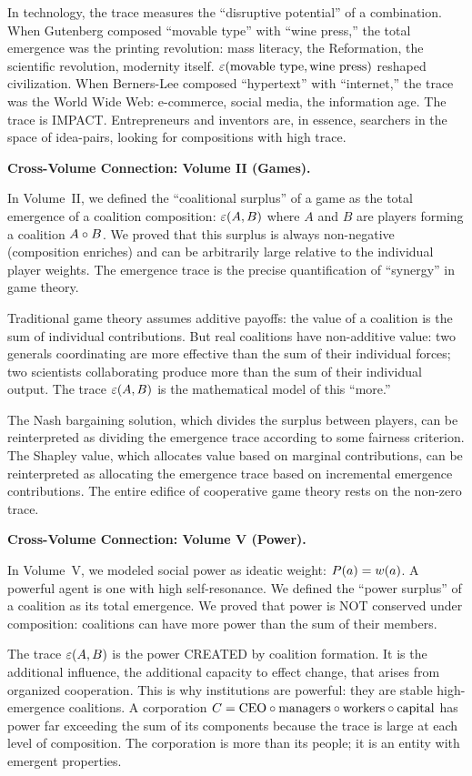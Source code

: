 \begin{interpretation}
In technology, the trace measures the ``disruptive potential'' of a combination.
When Gutenberg composed ``movable type'' with ``wine press,'' the total emergence
was the printing revolution: mass literacy, the Reformation, the scientific
revolution, modernity itself. $\varepsilon(\text{movable type}, \text{wine press})$
reshaped civilization. When Berners-Lee composed ``hypertext'' with ``internet,''
the trace was the World Wide Web: e-commerce, social media, the information age.
The trace is IMPACT. Entrepreneurs and inventors are, in essence, searchers in
the space of idea-pairs, looking for compositions with high trace.

\textbf{Cross-Volume Connection: Volume II (Games).}

In Volume~II, we defined the ``coalitional surplus'' of a game as the total
emergence of a coalition composition: $\varepsilon(A, B)$ where $A$ and $B$ are
players forming a coalition $A \circ B$. We proved that this surplus is
always non-negative (composition enriches) and can be arbitrarily large relative
to the individual player weights. The emergence trace is the precise quantification
of ``synergy'' in game theory.

Traditional game theory assumes additive payoffs: the value of a coalition is
the sum of individual contributions. But real coalitions have non-additive value:
two generals coordinating are more effective than the sum of their individual
forces; two scientists collaborating produce more than the sum of their individual
output. The trace $\varepsilon(A, B)$ is the mathematical model of this ``more.''

The Nash bargaining solution, which divides the surplus between players, can be
reinterpreted as dividing the emergence trace according to some fairness criterion.
The Shapley value, which allocates value based on marginal contributions, can be
reinterpreted as allocating the emergence trace based on incremental emergence
contributions. The entire edifice of cooperative game theory rests on the non-zero
trace.

\textbf{Cross-Volume Connection: Volume V (Power).}

In Volume~V, we modeled social power as ideatic weight: $P(a) = w(a)$.
A powerful agent is one with high self-resonance. We defined the ``power surplus''
of a coalition as its total emergence. We proved that power is NOT conserved
under composition: coalitions can have more power than the sum of their members.

The trace $\varepsilon(A, B)$ is the power CREATED by coalition formation. It is
the additional influence, the additional capacity to effect change, that arises
from organized cooperation. This is why institutions are powerful: they are
stable high-emergence coalitions. A corporation $C = \text{CEO} \circ \text{managers}
\circ \text{workers} \circ \text{capital}$ has power far exceeding the
sum of its components because the trace is large at each level of composition.
The corporation is more than its people; it is an entity with emergent properties.


\end{interpretation}
